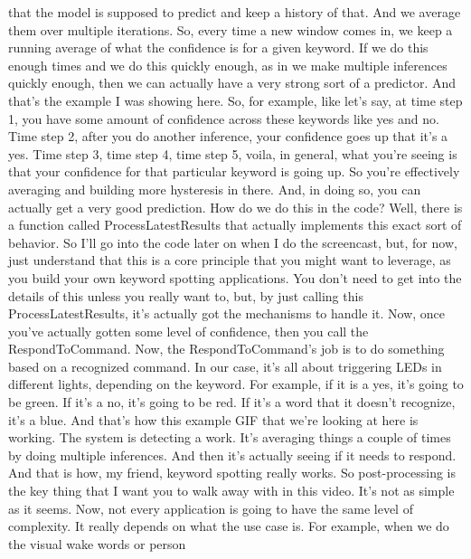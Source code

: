     that the model is supposed to predict and keep a history of that.
    And we average them over multiple iterations.
    So, every time a new window comes in, we keep a running average
    of what the confidence is for a given keyword.
    If we do this enough times and we do this quickly enough,
    as in we make multiple inferences quickly enough,
    then we can actually have a very strong sort of a predictor.
    And that's the example I was showing here.
    So, for example, like let's say, at time step 1,
    you have some amount of confidence across these keywords like yes and no.
    Time step 2, after you do another inference,
    your confidence goes up that it's a yes.
    Time step 3, time step 4, time step 5, voila, in general, what you're seeing
    is that your confidence for that particular keyword is going up.
    So you're effectively averaging and building more hysteresis in there.
    And, in doing so, you can actually get a very good prediction.
    How do we do this in the code?
    Well, there is a function called ProcessLatestResults that actually
    implements this exact sort of behavior.
    So I'll go into the code later on when I do the screencast, but, for now,
    just understand that this is a core principle
    that you might want to leverage, as you build
    your own keyword spotting applications.
    You don't need to get into the details of this unless you really want to,
    but, by just calling this ProcessLatestResults,
    it's actually got the mechanisms to handle it.
    Now, once you've actually gotten some level of confidence,
    then you call the RespondToCommand.
    Now, the RespondToCommand's job is to do something
    based on a recognized command.
    In our case, it's all about triggering LEDs in different lights,
    depending on the keyword.
    For example, if it is a yes, it's going to be green.
    If it's a no, it's going to be red.
    If it's a word that it doesn't recognize, it's a blue.
    And that's how this example GIF that we're looking at here is working.
    The system is detecting a work.
    It's averaging things a couple of times by doing multiple inferences.
    And then it's actually seeing if it needs to respond.
    And that is how, my friend, keyword spotting really works.
    So post-processing is the key thing that I want
    you to walk away with in this video.
    It's not as simple as it seems.
    Now, not every application is going to have the same level of complexity.
    It really depends on what the use case is.
    For example, when we do the visual wake words or person
